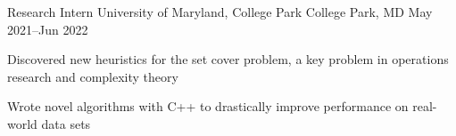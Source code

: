 \experience
{Research Intern}
{University of Maryland, College Park}
{College Park, MD}
{May 2021--Jun 2022}
{
	\item Discovered new heuristics for the set cover problem, a key problem in operations research and complexity theory
	\item Wrote novel algorithms with C++ to drastically improve performance on real-world data sets
}
